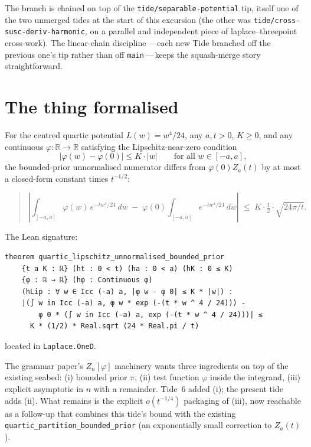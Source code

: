 \documentclass[11pt]{article}
\begin{document}
The branch is chained on top of the \texttt{tide/separable-potential} tip,
itself one of the two unmerged tides at the start of this excursion (the
other was \texttt{tide/cross-susc-deriv-harmonic}, on a parallel and
independent piece of laplace--threepoint cross-work). The linear-chain
discipline\,---\,each new Tide branched off the previous one's tip rather
than off \texttt{main}\,---\,keeps the squash-merge story straightforward.

\section{The thing formalised}

For the centred quartic potential $L(w) = w^4/24$, any $a, t > 0$, $K \ge 0$,
and any continuous $\varphi : \mathbb{R} \to \mathbb{R}$ satisfying the
Lipschitz-near-zero condition
\[
  |\varphi(w) - \varphi(0)| \le K \cdot |w|
  \qquad \text{for all } w \in [-a, a],
\]
the bounded-prior unnormalised numerator differs from $\varphi(0) Z_a(t)$ by
at most a closed-form constant times $t^{-1/2}$:

\begin{quote}\itshape
\[
  \left|\int_{[-a,a]} \varphi(w)\,e^{-tw^4/24}\,dw
        \;-\; \varphi(0) \int_{[-a,a]} e^{-tw^4/24}\,dw\right|
  \;\le\; K \cdot \tfrac{1}{2} \cdot \sqrt{24\pi / t}.
\]
\end{quote}

\noindent The Lean signature:
\begin{verbatim}
theorem quartic_lipschitz_unnormalised_bounded_prior
    {t a K : ℝ} (ht : 0 < t) (ha : 0 < a) (hK : 0 ≤ K)
    {φ : ℝ → ℝ} (hφ : Continuous φ)
    (hLip : ∀ w ∈ Icc (-a) a, |φ w - φ 0| ≤ K * |w|) :
    |(∫ w in Icc (-a) a, φ w * exp (-(t * w ^ 4 / 24))) -
        φ 0 * (∫ w in Icc (-a) a, exp (-(t * w ^ 4 / 24)))| ≤
      K * (1/2) * Real.sqrt (24 * Real.pi / t)
\end{verbatim}

\noindent located in \texttt{Laplace.OneD}.

The grammar paper's $Z_n[\varphi]$ machinery wants three ingredients on top
of the existing seabed: (i) bounded prior $\pi$, (ii) test function
$\varphi$ inside the integrand, (iii) explicit asymptotic in $n$ with a
remainder. Tide~6 added (i); the present tide adds (ii). What remains is
the explicit $o(t^{-1/4})$ packaging of (iii), now reachable as a follow-up
that combines this tide's bound with the existing
\texttt{quartic\_partition\_bounded\_prior} (an exponentially small
correction to $Z_a(t)$).
\end{document}
